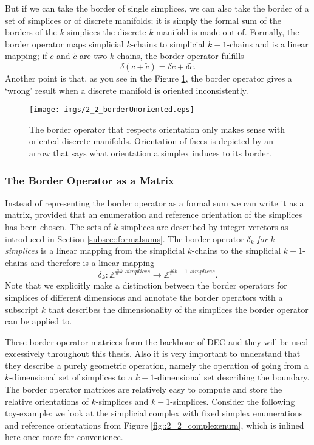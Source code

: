 But if we can take the border of single simplices, we can also take the border of a set of simplices or of discrete manifolds; it is simply the formal sum of the borders of the $k$-simplices the discrete $k$-manifold is made out of. Formally, the border operator maps simplicial $k$-chains to simplicial $k-1$-chains and is a linear mapping; if $c$ and $\widetilde{c}$ are two $k$-chains, the border operator fulfills
\[\delta (c+\widetilde{c}) = \delta c + \delta \widetilde{c}.\]
Another point is that, as you see in the Figure \ref{fig::2_2_borderUnoriented}, the border operator gives a `wrong' result when a discrete manifold is oriented inconsistently. 

\begin{figure}
\begin{center}
\texttt{[image: imgs/2\_2\_borderUnoriented.eps]}
\end{center}
\caption{The border operator that respects orientation only makes sense with oriented discrete manifolds. Orientation of faces is depicted by an arrow that says what orientation a simplex induces to its border.}
\label{fig::2_2_borderUnoriented}
\end{figure}

\subsubsection{The Border Operator as a Matrix}
Instead of representing the border operator as a formal sum we can write it as a matrix, provided that an enumeration and reference orientation of the simplices has been chosen. The sets of $k$-simplices are described by integer verctors as introduced in Section \ref{subsec::formalsums}. The border operator $\delta_k$ \emph{for $k$-simplices} is a linear mapping from the simplicial $k$-chains to the simplicial $k-1$-chains and therefore is a linear mapping  \[\delta_k:\mathbb Z^{\#k\text{-}simplices} \rightarrow \mathbb Z^{\#k-1\text{-}simplices}.\]
Note that we explicitly make a distinction between the border operators for simplices of different dimensions and annotate the border operators with a subscript $k$ that describes the dimensionality of the simplices the border operator can be applied to. 

These border operator matrices form the backbone of DEC and they will be used excessively throughout this thesis. Also it is very important to understand that they describe a purely geometric operation, namely the operation of going from a $k$-dimensional set of simplices to a $k-1$-dimensional set describing the boundary. The border operator matrices are relatively easy to compute and store the relative orientations of $k$-simplices and $k-1$-simplices. Consider the following toy-example: we look at the simplicial complex with fixed simplex enumerations and reference orientations from Figure \ref{fig::2_2_complexenum}, which is inlined here once more for convenience.

